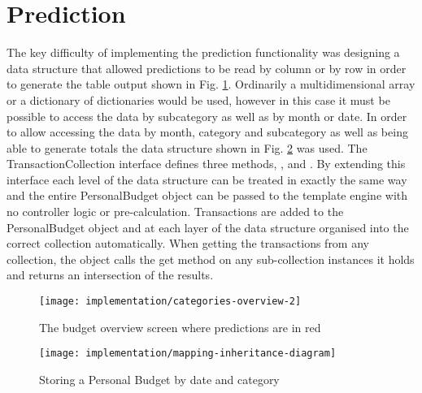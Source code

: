 \section{Prediction}
The key difficulty of implementing the prediction functionality was designing a data structure that allowed predictions to be read by column or by row in order to generate the table output shown in Fig. \ref{fig:imp-categories-overview}. Ordinarily a multidimensional array or a dictionary of dictionaries would be used, however in this case it must be possible to access the data by subcategory as well as by month or date.
%
In order to allow accessing the data by month, category and subcategory as well as being able to generate totals the data structure shown in Fig. \ref{fig:prediction-inheritance-diagram} was used. The TransactionCollection interface defines three methods, ,  and . By extending this interface each level of the data structure can be treated in exactly the same way and the entire PersonalBudget object can be passed to the template engine with no controller logic or pre-calculation. Transactions are added to the PersonalBudget object and at each layer of the data structure organised into the correct collection automatically. When getting the transactions from any collection, the object calls the get  method on any sub-collection instances it holds and returns an intersection of the results.

\begin{figure}[h]
    \centering
    \texttt{[image: implementation/categories-overview-2]}
    \caption{The budget overview screen where predictions are in red}
    \label{fig:imp-categories-overview}
\end{figure}

\begin{figure}[h]
    \centering
    \texttt{[image: implementation/mapping-inheritance-diagram]}
    \caption{Storing a Personal Budget by date and category}
    \label{fig:prediction-inheritance-diagram}
    
    \begin{comment}
[PersonalBudget]<>1-2>[Budget]
[<<Abstract>> CategoryCollection]^-[Budget]
[<<Interface>>;TransactionCollection]^-[Budget]
[<<Abstract>>;CategoryCollection]^-[TransactionDateCollection]
[<<Interface>>;TransactionCollection]^-[TransactionDateCollection]
[Budget]<>1-0..*>[TransactionDateCollection]
[<<Abstract>>;CategoryCollection]^-[TransactionCategoryCollection]
[<<Interface>>;TransactionCollection]^-[TransactionCategoryCollection]
[TransactionDateCollection]<>1-0..*>[TransactionCategoryCollection]
[<<Abstract>>;CategoryCollection]^-[TransactionSubCategoryCollection]
[<<Interface>>;TransactionCollection]^-[TransactionSubCategoryCollection]
[TransactionCategoryCollection]<>1-0..*>[TransactionSubCategoryCollection]
[TransactionSubCategoryCollection]<>1-0..*>[Transaction]
    \end{comment}
\end{figure}

